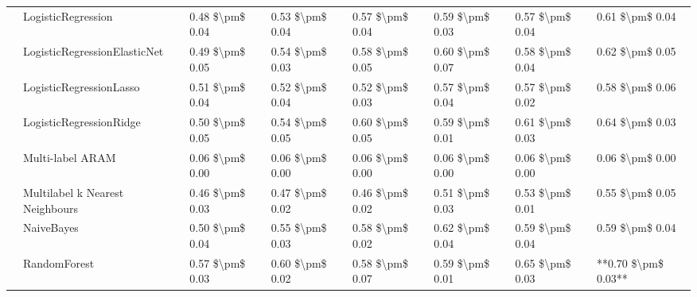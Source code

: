 \begin{tabular}{llllllll}
   & LogisticRegression &  0.48 \$\textbackslash pm\$ 0.04 &           0.53 \$\textbackslash pm\$ 0.04 &       0.57 \$\textbackslash pm\$ 0.04 &        0.59 \$\textbackslash pm\$ 0.03 &                         0.57 \$\textbackslash pm\$ 0.04 &      0.61 \$\textbackslash pm\$ 0.04 \\
   & LogisticRegressionElasticNet &  0.49 \$\textbackslash pm\$ 0.05 &           0.54 \$\textbackslash pm\$ 0.03 &       0.58 \$\textbackslash pm\$ 0.05 &        0.60 \$\textbackslash pm\$ 0.07 &                         0.58 \$\textbackslash pm\$ 0.04 &      0.62 \$\textbackslash pm\$ 0.05 \\
   & LogisticRegressionLasso &  0.51 \$\textbackslash pm\$ 0.04 &           0.52 \$\textbackslash pm\$ 0.04 &       0.52 \$\textbackslash pm\$ 0.03 &        0.57 \$\textbackslash pm\$ 0.04 &                         0.57 \$\textbackslash pm\$ 0.02 &      0.58 \$\textbackslash pm\$ 0.06 \\
   & LogisticRegressionRidge &  0.50 \$\textbackslash pm\$ 0.05 &           0.54 \$\textbackslash pm\$ 0.05 &       0.60 \$\textbackslash pm\$ 0.05 &        0.59 \$\textbackslash pm\$ 0.01 &                         0.61 \$\textbackslash pm\$ 0.03 &      0.64 \$\textbackslash pm\$ 0.03 \\
   & Multi-label ARAM &  0.06 \$\textbackslash pm\$ 0.00 &           0.06 \$\textbackslash pm\$ 0.00 &       0.06 \$\textbackslash pm\$ 0.00 &        0.06 \$\textbackslash pm\$ 0.00 &                         0.06 \$\textbackslash pm\$ 0.00 &      0.06 \$\textbackslash pm\$ 0.00 \\
   & Multilabel k Nearest Neighbours &  0.46 \$\textbackslash pm\$ 0.03 &           0.47 \$\textbackslash pm\$ 0.02 &       0.46 \$\textbackslash pm\$ 0.02 &        0.51 \$\textbackslash pm\$ 0.03 &                         0.53 \$\textbackslash pm\$ 0.01 &      0.55 \$\textbackslash pm\$ 0.05 \\
   & NaiveBayes &  0.50 \$\textbackslash pm\$ 0.04 &           0.55 \$\textbackslash pm\$ 0.03 &       0.58 \$\textbackslash pm\$ 0.02 &        0.62 \$\textbackslash pm\$ 0.04 &                         0.59 \$\textbackslash pm\$ 0.04 &      0.59 \$\textbackslash pm\$ 0.04 \\
   & RandomForest &  0.57 \$\textbackslash pm\$ 0.03 &           0.60 \$\textbackslash pm\$ 0.02 &       0.58 \$\textbackslash pm\$ 0.07 &        0.59 \$\textbackslash pm\$ 0.01 &                         0.65 \$\textbackslash pm\$ 0.03 &  **0.70 \$\textbackslash pm\$ 0.03** \\

\end{tabular}
